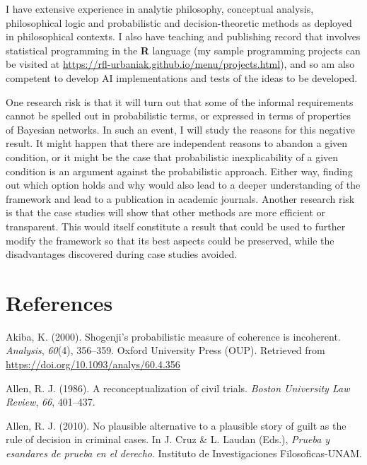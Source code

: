 \documentclass[11pt,dvipsnames,enabledeprecatedfontcommands]{scrartcl}
\begin{document}
I have extensive experience in analytic philosophy, conceptual analysis,
philosophical logic and probabilistic and decision-theoretic methods as
deployed in philosophical contexts. I also have teaching and publishing
record that involves statistical programming in the \textsf{\textbf{R}}
language (my sample programming projects can be visited at
\url{https://rfl-urbaniak.github.io/menu/projects.html}), and so am also
competent to develop AI implementations and tests of the ideas to be
developed.

One research risk is that it will turn out that some of the informal
requirements cannot be spelled out in probabilistic terms, or expressed
in terms of properties of Bayesian networks. In such an event, I will
study the reasons for this negative result. It might happen that there
are independent reasons to abandon a given condition, or it might be the
case that probabilistic inexplicability of a given condition is an
argument against the probabilistic approach. Either way, finding out
which option holds and why would also lead to a deeper understanding of
the framework and lead to a publication in academic journals. Another
research risk is that the case studies will show that other methods are
more efficient or transparent. This would itself constitute a result
that could be used to further modify the framework so that its best
aspects could be preserved, while the disadvantages discovered during
case studies avoided.

\section{References}\label{references}

\footnotesize 

\hypertarget{refs}{}
\hypertarget{ref-Akiba2000Shogenjis}{}
Akiba, K. (2000). Shogenji's probabilistic measure of coherence is
incoherent. \emph{Analysis}, \emph{60}(4), 356--359. Oxford University
Press (OUP). Retrieved from
\url{https://doi.org/10.1093/analys/60.4.356}

\hypertarget{ref-Allen1986A-Reconceptuali}{}
Allen, R. J. (1986). A reconceptualization of civil trials. \emph{Boston
University Law Review}, \emph{66}, 401--437.

\hypertarget{ref-Allen2010No-Plausible-Al}{}
Allen, R. J. (2010). No plausible alternative to a plausible story of
guilt as the rule of decision in criminal cases. In J. Cruz \& L. Laudan
(Eds.), \emph{Prueba y esandares de prueba en el derecho}. Instituto de
Investigaciones Filosoficas-UNAM.
\end{document}
